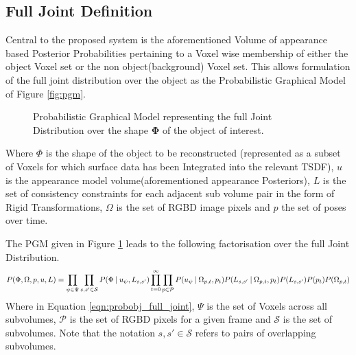 \subsection{Full Joint Definition}
\label{subsec:probobj_full_joint}
Central to the proposed system is the aforementioned Volume of appearance based
Posterior Probabilities pertaining to a Voxel wise membership of either the
object Voxel set or the non object(background) Voxel set. This allows
formulation of the full joint distribution over the object as the Probabilistic
Graphical Model of Figure \ref{fig:pgm}.

\begin{figure}[ht]
  \label{fig:probobj_pgm1}
  \centering
  \caption{Probabilistic Graphical Model representing the full Joint
    Distribution over the shape $\mathbf{\Phi}$ of the object of interest.}
\end{figure}

Where $\Phi$ is the shape of the object to be reconstructed (represented as a
subset of Voxels for which surface data has been Integrated into the relevant
TSDF), $u$ is the appearance model volume(aforementioned appearance Posteriors),
$L$ is the set of consistency constraints for each adjacent sub volume pair in
the form of Rigid Transformations, $\Omega$ is the set of RGBD image pixels and
$p$ the set of poses over time.

The PGM given in Figure \ref{fig:probobj_pgm1} leads to the following
factorisation over the full Joint Distribution.
\begin{equation}
  \label{eqn:probobj_full_joint}
  P(\Phi, \Omega, p, u, L) = 
  \prod_{\psi \in \Psi}\prod_{s, s' \in \mathcal{S}}
  P(\Phi \:\vert\: u_{\psi}, L_{s, s'}) 
  \prod_{t=0}^{\infty}\prod_{p \in \mathcal{P}}
  P(u_{\psi} \:\vert\: \Omega_{p, t}, p_{t})
  P(L_{s, s'} \:\vert\: \Omega_{p, t}, p_{t})
  P(L_{s, s'})P(p_{t})P(\Omega_{p, t})
\end{equation}
Where in Equation \ref{eqn:probobj_full_joint}, $\Psi$ is the set of Voxels
across all subvolumes, $\mathcal{P}$ is the set of RGBD pixels for a given 
frame and $\mathcal{S}$ is the set of subvolumes. Note that the notation
$s, s' \in \mathcal{S}$ refers to pairs of overlapping subvolumes.

